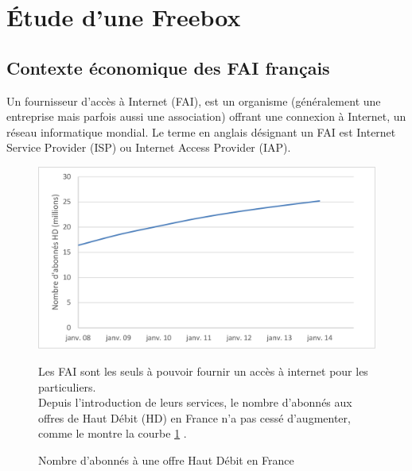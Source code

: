 

\section{Étude d'une Freebox}

\subsection{Contexte économique des FAI français}

Un fournisseur d'accès à Internet (FAI), est un organisme (généralement une entreprise mais parfois aussi une association) offrant une connexion à Internet, un réseau informatique mondial. Le terme en anglais désignant un FAI est Internet Service Provider (ISP) ou Internet Access Provider (IAP).

\begin{figure}[htbp]
\begin{minipage}{0.58\linewidth}
\begin{center}
\includegraphics[width=0.9\linewidth]{img/abon_france}
\caption{Nombre d'abonnés à une offre Haut Débit en France}
\label{fig:abon_france}
\end{center}
\end{minipage}
\hfill
\begin{minipage}{0.4\linewidth}
Les FAI sont les seuls à pouvoir fournir un accès à internet pour les particuliers. \\ Depuis l'introduction de leurs services, le nombre d'abonnés aux offres de Haut Débit (HD) en France n'a pas cessé d'augmenter, comme le montre la courbe \ref{fig:abon_france} .
\end{minipage}
\end{figure}


